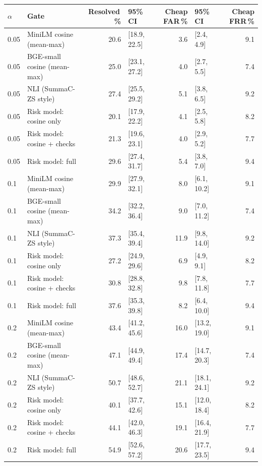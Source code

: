 \begin{tabular}{llrlrlr}
\toprule
$\alpha$ & Gate & Resolved\,\% & 95\% CI & Cheap FAR\,\% & 95\% CI & Cheap FRR\,\% \\
\midrule
0.05 & MiniLM cosine (mean-max) & 20.6 & [18.9, 22.5] & 3.6 & [2.4, 4.9] & 9.1 \\
0.05 & BGE-small cosine (mean-max) & 25.0 & [23.1, 27.2] & 4.0 & [2.7, 5.5] & 7.4 \\
0.05 & NLI (SummaC-ZS style) & 27.4 & [25.5, 29.2] & 5.1 & [3.8, 6.5] & 9.2 \\
0.05 & Risk model: cosine only & 20.1 & [17.9, 22.2] & 4.1 & [2.5, 5.8] & 8.2 \\
0.05 & Risk model: cosine + checks & 21.3 & [19.6, 23.1] & 4.0 & [2.9, 5.2] & 7.7 \\
0.05 & Risk model: full & 29.6 & [27.4, 31.7] & 5.4 & [3.8, 7.0] & 9.4 \\
\midrule
0.1 & MiniLM cosine (mean-max) & 29.9 & [27.9, 32.1] & 8.0 & [6.1, 10.2] & 9.1 \\
0.1 & BGE-small cosine (mean-max) & 34.2 & [32.2, 36.4] & 9.0 & [7.0, 11.2] & 7.4 \\
0.1 & NLI (SummaC-ZS style) & 37.3 & [35.4, 39.4] & 11.9 & [9.8, 14.0] & 9.2 \\
0.1 & Risk model: cosine only & 27.2 & [24.9, 29.6] & 6.9 & [4.9, 9.1] & 8.2 \\
0.1 & Risk model: cosine + checks & 30.8 & [28.8, 32.8] & 9.8 & [7.8, 11.8] & 7.7 \\
0.1 & Risk model: full & 37.6 & [35.3, 39.8] & 8.2 & [6.4, 10.0] & 9.4 \\
\midrule
0.2 & MiniLM cosine (mean-max) & 43.4 & [41.2, 45.6] & 16.0 & [13.2, 19.0] & 9.1 \\
0.2 & BGE-small cosine (mean-max) & 47.1 & [44.9, 49.4] & 17.4 & [14.7, 20.3] & 7.4 \\
0.2 & NLI (SummaC-ZS style) & 50.7 & [48.6, 52.7] & 21.1 & [18.1, 24.1] & 9.2 \\
0.2 & Risk model: cosine only & 40.1 & [37.7, 42.6] & 15.1 & [12.0, 18.4] & 8.2 \\
0.2 & Risk model: cosine + checks & 44.1 & [42.0, 46.3] & 19.1 & [16.4, 21.9] & 7.7 \\
0.2 & Risk model: full & 54.9 & [52.6, 57.2] & 20.6 & [17.7, 23.5] & 9.4 \\
\bottomrule
\end{tabular}

